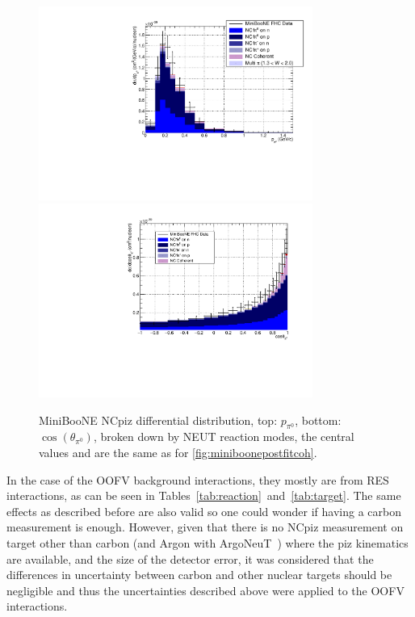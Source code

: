 \begin{figure}[ht]
  \center
  \includegraphics[width=0.8\textwidth]{T2K-TN-254/images/systematics/MB_NC1Pi0_comp_ppi.pdf} %
  \includegraphics[width=0.8\textwidth]{T2K-TN-254/images/systematics/MB_NC1Pi0_comp_cospi.pdf} %
  \caption[MiniBooNE NC$\pi^0$ differential
  distribution]{\Gls{MiniBooNE} \Gls{NC}\gls{piz} differential
    distribution, top: $p_{\pi^{0}}$, bottom:
    $\cos(\theta_{\pi^{0}})$, broken down by \Gls{NEUT} reaction
    modes, the central values and are the same as for
    \ref{fig:miniboonepostfitcoh}.}
  \label{fig:miniboonebreakdown}
\end{figure}

In the case of the \Gls{OOFV} background interactions, they mostly are
from \Gls{RES} interactions, as can be seen in
Tables~\ref{tab:reaction}~and~\ref{tab:target}. The same effects as
described before are also valid so one could wonder if having a carbon
measurement is enough. However, given that there is no
\Gls{NC}\gls{piz} measurement on target other than carbon (and Argon
with \Gls{ArgoNeuT}~\cite{Acciarri:2015ncl}) where the \Gls{piz}
kinematics are available, and the size of the detector error, it was
considered that the differences in uncertainty between carbon and
other nuclear targets should be negligible and thus the uncertainties
described above were applied to the \Gls{OOFV} interactions.

